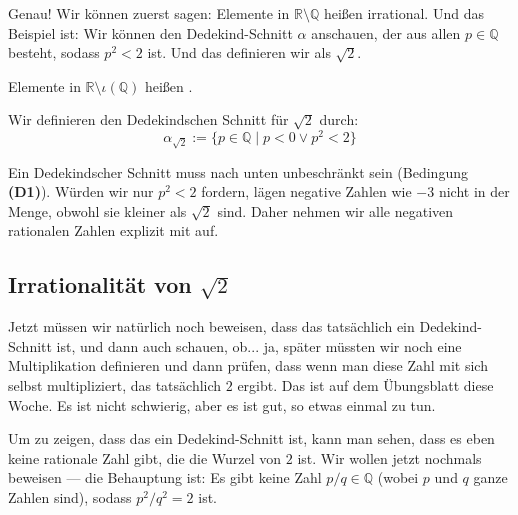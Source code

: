 \begin{spoken-clean}[00:37:12 - 00:39:57]
Genau! Wir können zuerst sagen: Elemente in $\mathbb{R} \setminus \mathbb{Q}$ heißen irrational. Und das Beispiel ist: Wir können den Dedekind-Schnitt $\alpha$ anschauen, der aus allen $p \in \mathbb{Q}$ besteht, sodass $p^2 < 2$ ist. Und das definieren wir als $\sqrt{2}$.
\end{spoken-clean}

\begin{math-stroke}
Elemente in $\mathbb{R} \setminus \iota(\mathbb{Q})$ heißen .

\begin{example}\label{ex:sqrt-2-cut}
Wir definieren den Dedekindschen Schnitt für $\sqrt{2}$ durch:
\begin{equation}
\label{eq:sqrt-2-def}
\alpha_{\sqrt{2}} := \{ p \in \mathbb{Q} \mid p < 0 \lor p^2 < 2 \}
\end{equation}
\end{example}

\begin{explanation-of-steps}
Ein Dedekindscher Schnitt muss nach unten unbeschränkt sein (Bedingung \textbf{(D1)}). Würden wir nur $p^2 < 2$ fordern, lägen negative Zahlen wie $-3$ nicht in der Menge, obwohl sie kleiner als $\sqrt{2}$ sind. Daher nehmen wir alle negativen rationalen Zahlen explizit mit auf.
\end{explanation-of-steps}
\end{math-stroke}

\subsection{Irrationalität von \texorpdfstring{$\sqrt{2}$}{Wurzel 2}}

\begin{spoken-clean}[00:39:57 - 00:43:12]
Jetzt müssen wir natürlich noch beweisen, dass das tatsächlich ein Dedekind-Schnitt ist, und dann auch schauen, ob... ja, später müssten wir noch eine Multiplikation definieren und dann prüfen, dass wenn man diese Zahl mit sich selbst multipliziert, das tatsächlich $2$ ergibt. Das ist auf dem Übungsblatt diese Woche. Es ist nicht schwierig, aber es ist gut, so etwas einmal zu tun.

Um zu zeigen, dass das ein Dedekind-Schnitt ist, kann man sehen, dass es eben keine rationale Zahl gibt, die die Wurzel von $2$ ist. Wir wollen jetzt nochmals beweisen --- die Behauptung ist: Es gibt keine Zahl $p/q \in \mathbb{Q}$ (wobei $p$ und $q$ ganze Zahlen sind), sodass $p^2 / q^2 = 2$ ist.
\end{spoken-clean}

